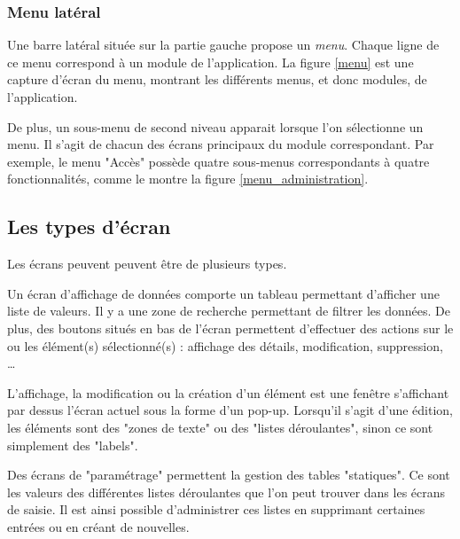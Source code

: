 
\subsubsection{Menu latéral}

Une barre latéral située sur la partie gauche propose un \textit{menu}. Chaque ligne de ce menu correspond à un module de l'application. La figure \ref{menu} est une capture d'écran du menu, montrant les différents menus, et donc modules, de l'application.

De plus, un sous-menu de second niveau apparait lorsque l'on sélectionne un menu. Il s'agit de chacun des écrans principaux du module correspondant. Par exemple, le menu "Accès" possède quatre sous-menus correspondants à quatre fonctionnalités, comme le montre la figure \ref{menu_administration}.



\subsection{Les types d'écran}

Les écrans peuvent peuvent être de plusieurs types.

Un écran d'affichage de données comporte un tableau permettant d'afficher une liste de valeurs. Il y a une zone de recherche permettant de filtrer les données. De plus, des boutons situés en bas de l'écran permettent d'effectuer des actions sur le ou les élément(s) sélectionné(s) : affichage des détails, modification, suppression, \ldots

L'affichage, la modification ou la création d'un élément est une fenêtre s'affichant par dessus l'écran actuel sous la forme d'un pop-up. Lorsqu'il s'agit d'une édition, les éléments sont des "zones de texte" ou des "listes déroulantes", sinon ce sont simplement des "labels".

Des écrans de "paramétrage" permettent la gestion des tables "statiques". Ce sont les valeurs des différentes listes déroulantes que l'on peut trouver dans les écrans de saisie. Il est ainsi possible d'administrer ces listes en supprimant certaines entrées ou en créant de nouvelles.


